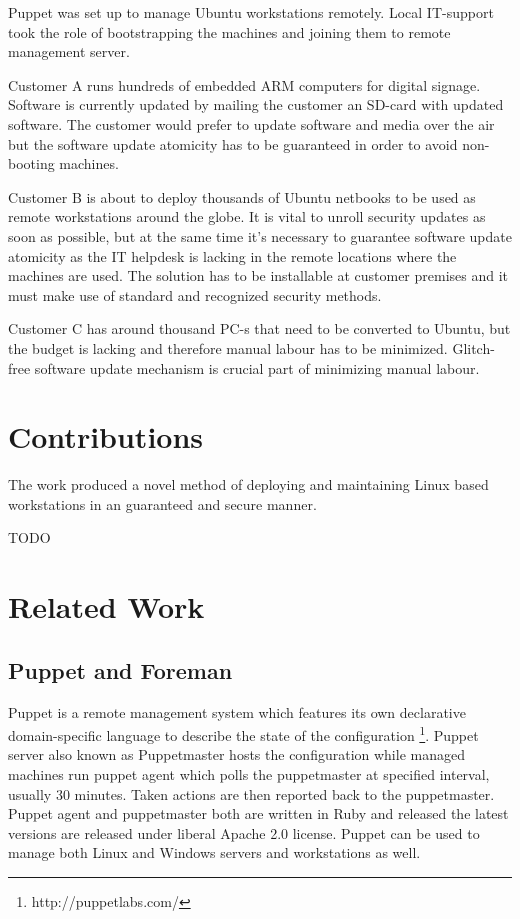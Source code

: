 \documentclass[a4paper,11pt]{kth-mag}
\begin{document}
Puppet was set up to manage Ubuntu workstations remotely. Local IT-support
took the role of bootstrapping the machines and joining them to remote
management server.

Customer A runs hundreds of embedded ARM computers for digital signage.
Software is currently updated by mailing the customer an SD-card with
updated software. The customer would prefer to update software and
media over the air but the software update atomicity has to be guaranteed
in order to avoid non-booting machines.

Customer B is about to deploy thousands of Ubuntu netbooks to be used as
remote workstations around the globe. It is vital to unroll security updates
as soon as possible, but at the same time it's necessary to guarantee
software update atomicity as the IT helpdesk is lacking in the remote
locations where the machines are used.
The solution has to be installable at customer premises and it
must make use of standard and recognized security methods.

Customer C has around thousand PC-s that need to be converted to Ubuntu,
but the budget is lacking and therefore manual labour has to be minimized.
Glitch-free software update mechanism is crucial part of minimizing manual
labour.

\section{Contributions}

The work produced a novel method of deploying and maintaining Linux
based workstations in an guaranteed and secure manner.

TODO

\section{Related Work}
\label{sec:related}

\subsection{Puppet and Foreman}

Puppet is a remote management system which features its own declarative
domain-specific language to describe the state of the configuration
\footnote{http://puppetlabs.com/}. Puppet server also known as Puppetmaster
hosts the configuration while managed machines run puppet agent which polls
the puppetmaster at specified interval, usually 30 minutes. Taken actions
are then reported back to the puppetmaster. Puppet agent and puppetmaster
both are written in Ruby and released the latest versions are released under
liberal Apache 2.0 license. Puppet can be used to manage both Linux and
Windows servers and workstations as well.
\end{document}
